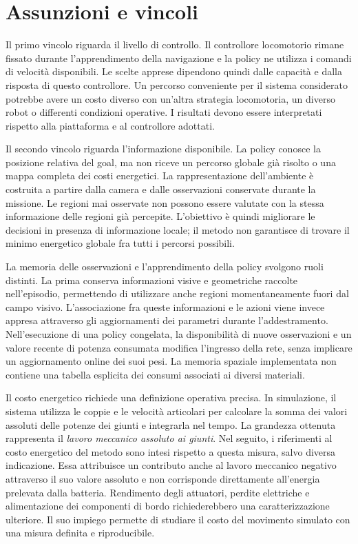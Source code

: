 \section{Assunzioni e vincoli}
\label{sec:intro-vincoli}

Il primo vincolo riguarda il livello di controllo. Il controllore locomotorio rimane fissato durante l'apprendimento della navigazione e la policy ne utilizza i comandi di velocità disponibili. Le scelte apprese dipendono quindi dalle capacità e dalla risposta di questo controllore. Un percorso conveniente per il sistema considerato potrebbe avere un costo diverso con un'altra strategia locomotoria, un diverso robot o differenti condizioni operative. I risultati devono essere interpretati rispetto alla piattaforma e al controllore adottati.

Il secondo vincolo riguarda l'informazione disponibile. La policy conosce la posizione relativa del goal, ma non riceve un percorso globale già risolto o una mappa completa dei costi energetici. La rappresentazione dell'ambiente è costruita a partire dalla camera e dalle osservazioni conservate durante la missione. Le regioni mai osservate non possono essere valutate con la stessa informazione delle regioni già percepite. L'obiettivo è quindi migliorare le decisioni in presenza di informazione locale; il metodo non garantisce di trovare il minimo energetico globale fra tutti i percorsi possibili. 

La memoria delle osservazioni e l'apprendimento della policy svolgono ruoli distinti. La prima conserva informazioni visive e geometriche raccolte nell'episodio, permettendo di utilizzare anche regioni momentaneamente fuori dal campo visivo. L'associazione fra queste informazioni e le azioni viene invece appresa attraverso gli aggiornamenti dei parametri durante l'addestramento. Nell'esecuzione di una policy congelata, la disponibilità di nuove osservazioni e un valore recente di potenza consumata modifica l'ingresso della rete, senza implicare un aggiornamento online dei suoi pesi. La memoria spaziale implementata non contiene una tabella esplicita dei consumi associati ai diversi materiali.

Il costo energetico richiede una definizione operativa precisa. In simulazione, il sistema utilizza le coppie e le velocità articolari per calcolare la somma dei valori assoluti delle potenze dei giunti e integrarla nel tempo. La grandezza ottenuta rappresenta il \emph{lavoro meccanico assoluto ai giunti}. Nel seguito, i riferimenti al costo energetico del metodo sono intesi rispetto a questa misura, salvo diversa indicazione. Essa attribuisce un contributo anche al lavoro meccanico negativo attraverso il suo valore assoluto e non corrisponde direttamente all'energia prelevata dalla batteria. Rendimento degli attuatori, perdite elettriche e alimentazione dei componenti di bordo richiederebbero una caratterizzazione ulteriore. Il suo impiego permette di studiare il costo del movimento simulato con una misura definita e riproducibile.

